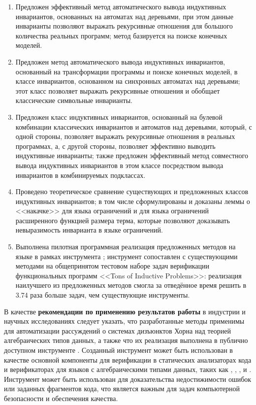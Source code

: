 
\begin{enumerate}
\item Предложен эффективный метод автоматического вывода индуктивных инвариантов, основанных на автоматах над деревьями, при этом данные инварианты позволяют выражать рекурсивные отношения для большого количества реальных программ; метод базируется на поиске конечных моделей.
\item Предложен метод автоматического вывода индуктивных инвариантов, основанный на трансформации программы и поиске конечных моделей, в классе инвариантов, основанном на синхронных автоматах над деревьями; этот класс позволяет выражать рекурсивные отношения и обобщает классические символьные инварианты.
\item Предложен класс индуктивных инвариантов, основанный на булевой комбинации классических инвариантов и автоматов над деревьями, который, с одной стороны, позволяет выражать рекурсивные отношения в реальных программах, а, с другой стороны, позволяет эффективно выводить индуктивные инварианты; также предложен эффективный метод совместного вывода индуктивных инвариантов в этом классе посредством вывода инвариантов в комбинируемых подклассах.
\item Проведено теоретическое сравнение существующих и предложенных классов индуктивных инвариантов; в том числе сформулированы и доказаны леммы о <<накачке>> для языка ограничений и для языка ограничений расширенного функцией размера терма, которые позволяют доказывать невыразимость инварианта в языке ограничений.
\item Выполнена пилотная программная реализация предложенных методов на языке \fsharp{} в рамках инструмента \theringen{}; инструмент сопоставлен с существующими методами на общепринятом тестовом наборе задач верификации функциональных программ <<Tons of Inductive Problems>>: реализация наилучшего из предложенных методов смогла за отведённое время решить в 3.74 раза больше задач, чем существующие инструменты.
\end{enumerate}

В качестве \textbf{рекомендации по применению результатов работы} в индустрии и научных исследованиях следует указать, что разработанные методы применимы для автоматизации рассуждений о системах дизъюнктов Хорна над теорией алгебраических типов данных, а также что их реализация выполнена в публично доступном инструменте \theringen{}. Созданный инструмент может быть использован в качестве основной компоненты для верификации в статических анализаторах кода и верификаторах для языков с алгебраическими типами данных, таких как \rust{}, \scala{}, \solidity{}, \haskell{} и \ocaml{}. Инструмент может быть использован для доказательства недостижимости ошибок или заданных фрагментов кода, что является важным для задач компьютерной безопасности и обеспечения качества.

